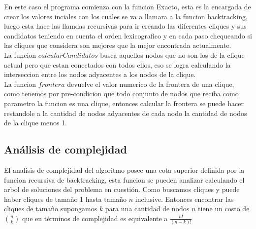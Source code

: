 En este caso el programa comienza con la funcion Exacto, esta es la encargada de crear los valores inciales con los cuales se va a llamara a la funcion backtracking, luego esta hace las llamdas recursivas para ir creando las diferentes cliques y sus candidatos teniendo en cuenta el orden lexicografico y en cada paso chequeando si las cliques que considera son mejores que la mejor encontrada actualmente. \\
La funcion $calcularCandidatos$ busca aquellos nodos que no son los de la clique actual pero que estan conectados con todos ellos, eso se logra calculando la interseccion entre los nodos adyacentes a los nodos de la clique. \\
La funcion $frontera$ devuelve el valor numerico de la frontera de una clique, como tenemos por pre-condicion que todo conjunto de nodos que reciba como parametro la funcion es una clique, entonces calcular la frontera se puede hacer restandole a la cantidad de nodos adyacentes de cada nodo la cantidad de nodos de la clique menos 1. 

\subsection{Análisis de complejidad}

El analisis de complejidad del algoritmo posee una cota superior definida por la funcion recursiva de backtracking, esta funcion se pueden analizar calculando el arbol de soluciones del problema en cuestión. Como buscamos cliques y puede haber cliques de tamaño 1 hasta tamaño $n$ inclusive. Entonces encontrar las cliques de tamaño supongamos $k$ para una cantidad de nodos $n$ tiene un costo de {$n \choose k$} que en términos de complejidad es equivalente a $\frac{n!}{(n-k)!}$ 
